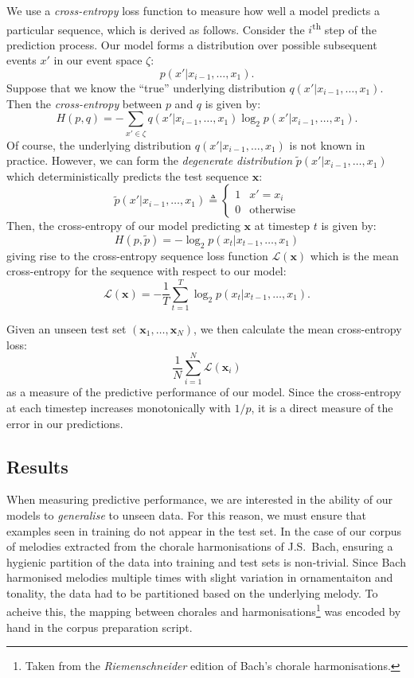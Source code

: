 \documentclass[12pt,a4paper,twoside,openright]{report}
\newcommand{\vect}[1]{\boldsymbol{\mathbf{#1}}}
\begin{document}
We use a \emph{cross-entropy} loss function to measure how well a model predicts
a particular sequence, which is derived as follows.  
Consider the $i$\textsuperscript{th} step of the prediction process. Our model
forms a distribution over possible subsequent events $x'$ in our event space
$\zeta$:
$$ p(x' | x_{i-1}, \ldots, x_1). $$
Suppose that we know the ``true'' underlying distribution $q(x' |
x_{i-1}, \ldots, x_1)$. Then the \emph{cross-entropy} between $p$ and
$q$ is given by:
$$ H(p,q) = - \sum_{x' \in \zeta} q(x' | x_{i-1}, \ldots, x_1) \log_2{ p(x' |
x_{i-1}, \ldots, x_1)}. $$
Of course, the underlying distribution $q(x' | x_{i-1}, \ldots, x_1)$ is not
known in practice. However, we can form the \emph{degenerate distribution}
$\widetilde{p}(x' | x_{i-1}, \ldots, x_1)$ which deterministically predicts the
test sequence $\vect{x}$:
$$ \widetilde{p}(x' | x_{i-1}, \ldots, x_1) \triangleq \begin{cases}
  1 & x' = x_i \\
  0 & \text{otherwise}
\end{cases} $$
Then, the cross-entropy of our model predicting $\vect{x}$ at timestep $t$ is
given by: 
$$ H(p,\widetilde{p}) = - \log_2{ p(x_t | x_{t-1}, \ldots, x_1) } $$
giving rise to the cross-entropy sequence loss function
$\mathcal{L}(\vect{x})$
which is the mean cross-entropy for the sequence with respect to our model:
$$ \mathcal{L}(\vect{x}) = - \frac{1}{T} \sum_{t = 1}^T \log_2{ p(x_t | x_{t-1},
\ldots, x_1) }. $$

Given an unseen test set $(\vect{x}_1,\ldots,\vect{x}_N)$, we then calculate the
mean cross-entropy loss:
$$ \frac{1}{N}\sum_{i = 1}^N \mathcal{L}(\vect{x}_i) $$
as a measure of the predictive performance of our model. Since the cross-entropy
at each timestep increases monotonically with $1/p$, it is a direct measure of
the error in our predictions. 

\subsection{Results}

When measuring predictive performance, we are interested in the ability of our
models to \emph{generalise} to unseen data. For this reason, we must ensure that
examples seen in training do not appear in the test set. In the case of our
corpus of melodies extracted from the chorale harmonisations of J.S.\ Bach,
ensuring a hygienic partition of the data into training and test sets is
non-trivial. Since Bach harmonised melodies multiple times with slight variation
in ornamentaiton and tonality, the data had to be partitioned based on the
underlying melody. To acheive this, the mapping between chorales and
harmonisations\footnote{Taken from the \emph{Riemenschneider} edition of Bach's
chorale harmonisations.} was encoded by hand in the corpus preparation script.
\end{document}
